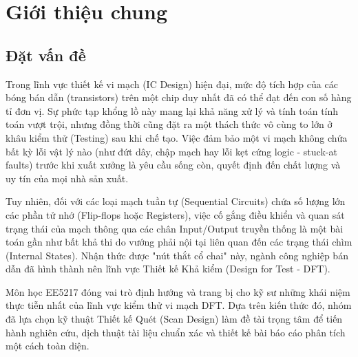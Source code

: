 \section{Giới thiệu chung}

\subsection{Đặt vấn đề}
Trong lĩnh vực thiết kế vi mạch (IC Design) hiện đại, mức độ tích hợp của các bóng bán dẫn (transistors) trên một chip duy nhất đã có thể đạt đến con số hàng tỉ đơn vị. Sự phức tạp khổng lồ này mang lại khả năng xử lý và tính toán tính toán vượt trội, nhưng đồng thời cũng đặt ra một thách thức vô cùng to lớn ở khâu kiểm thử (Testing) sau khi chế tạo. Việc đảm bảo một vi mạch không chứa bất kỳ lỗi vật lý nào (như đứt dây, chập mạch hay lỗi kẹt cứng logic - stuck-at faults) trước khi xuất xưởng là yêu cầu sống còn, quyết định đến chất lượng và uy tín của mọi nhà sản xuất. 

Tuy nhiên, đối với các loại mạch tuần tự (Sequential Circuits) chứa số lượng lớn các phần tử nhớ (Flip-flops hoặc Registers), việc cố gắng điều khiển và quan sát trạng thái của mạch thông qua các chân Input/Output truyền thống là một bài toán gần như bất khả thi do vướng phải nội tại liên quan đến các trạng thái chìm (Internal States). Nhận thức được "nút thắt cổ chai" này, ngành công nghiệp bán dẫn đã hình thành nên lĩnh vực Thiết kế Khả kiểm (Design for Test - DFT).

Môn học EE5217 đóng vai trò định hướng và trang bị cho kỹ sư những khái niệm thực tiễn nhất của lĩnh vực kiểm thử vi mạch DFT. Dựa trên kiến thức đó, nhóm đã lựa chọn kỹ thuật Thiết kế Quét (Scan Design) làm đề tài trọng tâm để tiến hành nghiên cứu, dịch thuật tài liệu chuẩn xác và thiết kế bài báo cáo phân tích một cách toàn diện.

